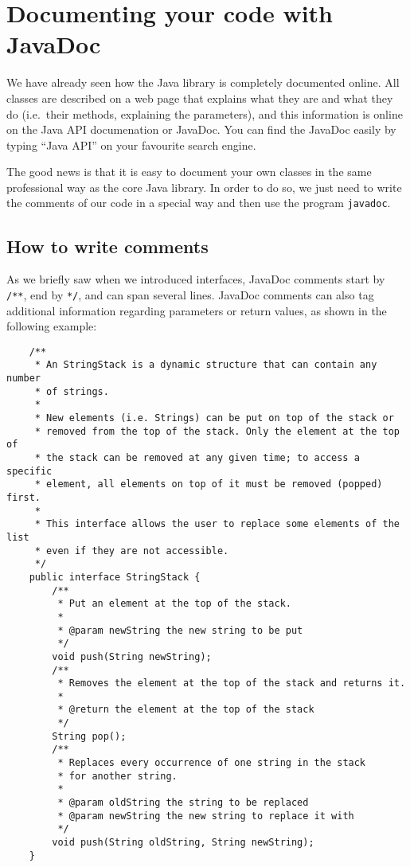 
\section{Documenting your code with JavaDoc}
\label{sec:docum-your-code}


We have already seen how the Java library is completely documented
online. All classes are described on a web page that explains
what they are and what they do (i.e.~their
methods, explaining the parameters), and this information is online on
the Java API documenation or JavaDoc. You can find the JavaDoc easily
by typing ``Java API'' on your favourite search engine. 

The good news is that it is easy to document your own classes in the
same professional way as the core Java library. In order to do so, we
just need to write the comments of our code in a special way and then
use the program \verb+javadoc+. 

\subsection{How to write comments}
\label{sec:writing-comments}

As we briefly saw when we introduced interfaces, JavaDoc comments
start by \verb+/**+, end by \verb+*/+, and can span several
lines. JavaDoc comments can also tag additional information regarding
parameters or return values, as shown in the following example: 

\begin{verbatim}
    /**
     * An StringStack is a dynamic structure that can contain any number
     * of strings. 
     * 
     * New elements (i.e. Strings) can be put on top of the stack or
     * removed from the top of the stack. Only the element at the top of
     * the stack can be removed at any given time; to access a specific 
     * element, all elements on top of it must be removed (popped) first. 
     * 
     * This interface allows the user to replace some elements of the list
     * even if they are not accessible. 
     */
    public interface StringStack {
        /**
         * Put an element at the top of the stack. 
         *
         * @param newString the new string to be put
         */
        void push(String newString);
        /**
         * Removes the element at the top of the stack and returns it. 
         *
         * @return the element at the top of the stack
         */
        String pop();
        /**
         * Replaces every occurrence of one string in the stack
         * for another string. 
         *
         * @param oldString the string to be replaced
         * @param newString the new string to replace it with
         */
        void push(String oldString, String newString);
    }
\end{verbatim}

